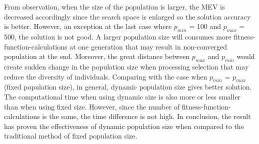 \documentclass[final]{elsarticle}
\begin{document}
From observation, when the size of the population is larger, the MEV is decreased accordingly since the search space is enlarged so the solution accuracy is better. However, an exception at the last case where $ p_{min} $ = 100 and $ p_{max} $ = 500, the solution is not good. A larger population size will consumes more fitness-function-calculations at one generation that may result in non-converged population at the end. Moreover, the great distance between $ p_{max} $ and $ p_{min} $ would create sudden change in the population size when processing selection that may reduce the diversity of individuals. Comparing with the case when  $ p_{min} $ = $ p_{max} $ (fixed population size), in general, dynamic population size gives better solution. The computational time when using dynamic size is also more or less smaller than when using fixed size. However, since the number of fitness-function-calculations is the same, the time difference is not high. In conclusion, the result has proven the effectiveness of dynamic population size when compared to the traditional method of fixed population size. 
%
\end{document}

